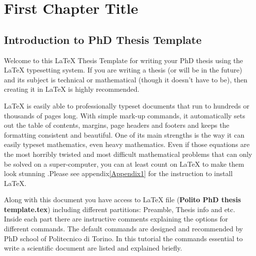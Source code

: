 
\chapter{First Chapter Title}  %
\label{chapter 1}
\ifpdf
    \graphicspath{{Chapter1/Figs/}{Chapter1/Figs/PDF/}{Chapter1/Figs/}}
\else
    \graphicspath{{Chapter1/Figs/Vector/}{Chapter1/Figs/}}
\fi


\section{Introduction to PhD Thesis Template} %
\label{section 1.1} %

Welcome to this \LaTeX{} Thesis Template for writing your PhD thesis using the \LaTeX{} typesetting system. If you are writing a thesis (or will be in the future) and its subject is technical or mathematical (though it doesn't have to be), then creating it in \LaTeX{} is highly recommended.

\LaTeX{} is easily able to professionally typeset documents that run to hundreds or thousands of pages long. With simple mark-up commands, it automatically sets out the table of contents, margins, page headers and footers and keeps the formatting consistent and beautiful. One of its main strengths is the way it can easily typeset mathematics, even heavy mathematics. Even if those equations are the most horribly twisted and most difficult mathematical problems that can only be solved on a super-computer, you can at least count on \LaTeX{} to make them look stunning \cite{lamport1994latex, hertel2010writing}.Please see appendix\ref{Appendix1} for the instruction to install \LaTeX.

Along with this document you have access to \LaTeX{} file (\textbf{Polito PhD thesis template.tex}) including different partitions: Preamble, Thesis info and etc. Inside each part there are instructive comments explaining the options for different commands. The default commands are designed and recommended by PhD school of Politecnico di Torino. In this tutorial the commands essential to write a scientific document are listed and explained briefly.  




